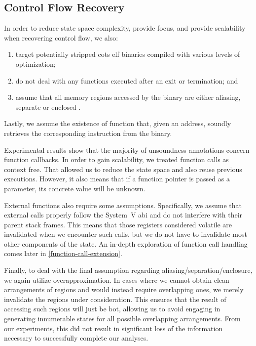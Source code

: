 \subsection{Control Flow Recovery}\label{cfr-assumptions}
In order to reduce state space complexity, provide focus, and provide scalability when recovering control flow, we also:
\begin{enumerate}
  \item target potentially stripped \ac{cots} \ac{elf} binaries compiled with various levels of optimization;
  \item do not deal with any functions executed after an exit or termination; and
  \item assume that all memory regions accessed by the binary are either aliasing, separate or enclosed \autocite{balakrishnan2004analyzing,balakrishnan2005codesurfer}.
\end{enumerate}
Lastly, we assume the existence of  function that, given an address, soundly retrieves the corresponding instruction from the binary.

Experimental results show that the majority of unsoundness annotations concern function callbacks.
In order to gain scalability, we treated function calls as context free.
That allowed us to reduce the state space and also reuse previous executions.
However, it also means that if a function pointer is passed as a parameter, its concrete value will be unknown.

External functions also require some assumptions.
Specifically, we assume that external calls properly follow the System~V \ac{abi} and do not interfere with their parent stack frames.
This means that those registers considered volatile are invalidated when we encounter such calls, but we do not have to invalidate most other components of the state.
An in-depth exploration of function call handling comes later in \cref{function-call-extension}.

Finally, to deal with the final assumption regarding aliasing/separation/enclosure, we again utilize overapproximation.
In cases where we cannot obtain clean arrangements of regions and would instead require overlapping ones, we merely invalidate the regions under consideration.
This ensures that the result of accessing such regions will just be \gls{bot}, allowing us to avoid engaging in generating innumerable states for all possible overlapping arrangements.
From our experiments, this did not result in significant loss of the information necessary to successfully complete our analyses.

